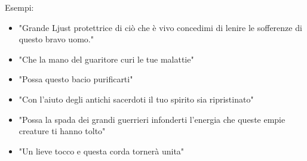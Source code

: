 \documentclass[a4paper,10 pt,twoside,openany]{book}
\begin{document}
Esempi:
\begin{itemize}
	\item
	"Grande Ljust protettrice di ciò che è vivo concedimi di lenire le sofferenze di questo bravo uomo."
	\item
	"Che la mano del guaritore curi le tue malattie"
	\item
	"Possa questo bacio purificarti"
	\item
	"Con l'aiuto degli antichi sacerdoti il tuo spirito sia ripristinato"
	\item
	"Possa la spada dei grandi guerrieri infonderti l'energia che queste empie creature ti hanno tolto"
	\item "Un lieve tocco e questa corda tornerà unita"
\end{itemize}

\bigskip
\end{document}
